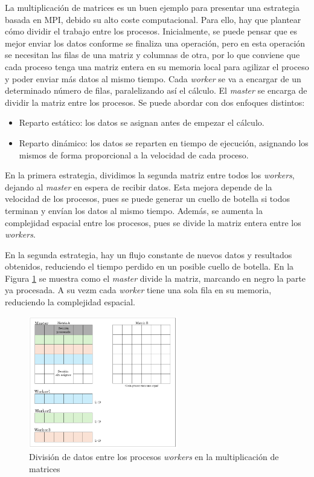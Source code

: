 	La multiplicación de matrices es un buen ejemplo para presentar una estrategia basada en MPI, debido su alto coste computacional. Para ello, hay que plantear cómo dividir el trabajo entre los procesos. Inicialmente, se puede pensar que es mejor enviar los datos conforme se finaliza una operación, pero en esta operación se necesitan las filas de una matriz y columnas de otra, por lo que conviene que cada proceso tenga una matriz entera en su memoria local para agilizar el proceso y poder enviar más datos al mismo tiempo. Cada \textit{worker} se va a encargar de un determinado número de filas, paralelizando así el cálculo. El \textit{master} se encarga de dividir la matriz entre los procesos. Se puede abordar con dos enfoques distintos:
	\begin{itemize}
		\item Reparto estático: los datos se asignan antes de empezar el cálculo. 
		\item Reparto dinámico: los datos se reparten en tiempo de ejecución, asignando los mismos de forma proporcional a la velocidad de cada proceso.
	\end{itemize}



	
	
	En la primera estrategia, dividimos la segunda matriz entre todos los \textit{workers}, dejando al \textit{master} en espera de recibir datos. Esta mejora depende de la velocidad de los procesos, pues se puede generar un cuello de botella si todos terminan y envían los datos al mismo tiempo. Además, se aumenta la complejidad espacial entre los procesos, pues se divide la matriz entera entre los \textit{workers}. 
	
	En la segunda estrategia, hay un flujo constante de nuevos datos y resultados obtenidos, reduciendo el tiempo perdido en un posible cuello de botella. En la Figura \ref{fig:matrizmpi} se muestra como el \textit{master} divide la matriz, marcando en negro la parte ya procesada. A su vezm cada \textit{worker} tiene una sola fila en su memoria, reduciendo la complejidad espacial.
	
	\begin{figure}[!h]
	 	\centering
	 	\includegraphics[width=0.58\textwidth]{images/chapter_3/matriz_mpi}
	 	\caption{División de datos entre los procesos \textit{workers} en la multiplicación de matrices}
	 	\label{fig:matrizmpi}
	\end{figure}


